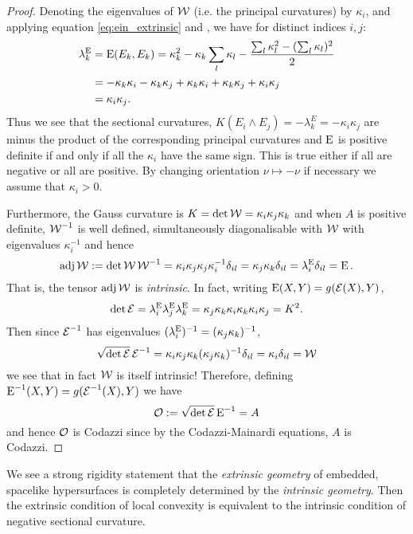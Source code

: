 \documentclass[a4paper, 12pt]{amsart}
\begin{document}
\begin{proof}
Denoting the eigenvalues of \(\operatorname{\mathcal{W}}\) (i.e. the principal curvatures) by \(\kappa_i\), and applying equation \eqref{eq:ein_extrinsic} and , we have for distinct indices \(i,j\):
\[
\begin{split}
\lambda^{\operatorname{E}}_k &= \operatorname{E}(E_k, E_k) = \kappa_k^2 - \kappa_k \sum_l \kappa_l - \frac{\sum_l \kappa_l^2 - (\sum_l \kappa_l)^2}{2} \\
&= - \kappa_k \kappa_i - \kappa_k \kappa_j + \kappa_k \kappa_i + \kappa_k \kappa_j + \kappa_i \kappa_j \\
&= \kappa_i \kappa_j.
\end{split}
\]
Thus we see that the sectional curvatures, \(K(E_i \wedge E_j) = - \lambda^E_k = -\kappa_i\kappa_j\) are minus the product of the corresponding principal curvatures and \(\operatorname{E}\) is positive definite if and only if all the \(\kappa_i\) have the same sign. This is true either if all are negative or all are positive. By changing orientation \(\nu \mapsto -\nu\) if necessary we assume that \(\kappa_i > 0\).

Furthermore, the Gauss curvature is \(K = \det \operatorname{\mathcal{W}} = \kappa_i \kappa_j \kappa_k\) and when \(A\) is positive definite, \(\operatorname{\mathcal{W}}^{-1}\) is well defined, simultaneously diagonalisable with \(\operatorname{\mathcal{W}}\) with eigenvalues \(\kappa_i^{-1}\) and hence
\[
\operatorname{adj} \operatorname{\mathcal{W}} := \det \operatorname{\mathcal{W}} \operatorname{\mathcal{W}}^{-1} = \kappa_i \kappa_j \kappa_j \kappa_i^{-1} \delta_{il} = \kappa_j \kappa_k \delta_{il} = \lambda^{\operatorname{E}}_i \delta_{il} = \operatorname{E}.
\]
That is, the tensor \(\operatorname{adj} \operatorname{\mathcal{W}}\) is \emph{intrinsic}. In fact, writing \(\operatorname{E}(X, Y) = g(\operatorname{\mathcal{E}} (X), Y)\),
\[
\det \operatorname{\mathcal{E}} = \lambda^{\operatorname{E}}_i \lambda^{\operatorname{E}}_j \lambda^{\operatorname{E}}_k = \kappa_j \kappa_k \kappa_i \kappa_k \kappa_i \kappa_j = K^2.
\]
Then since \(\operatorname{\mathcal{E}}^{-1}\) has eigenvalues \((\lambda_i^{\operatorname{E}})^{-1} = (\kappa_j \kappa_k)^{-1}\),
\[
\sqrt{\det \operatorname{\mathcal{E}}} \operatorname{\mathcal{E}}^{-1} = \kappa_i \kappa_j \kappa_k (\kappa_j \kappa_k)^{-1} \delta_{il} = \kappa_i \delta_{il} = \operatorname{\mathcal{W}}
\]
we see that in fact \(\operatorname{\mathcal{W}}\) is itself intrinsic! Therefore, defining \(\operatorname{E}^{-1}(X, Y) = g(\operatorname{\mathcal{E}}^{-1} (X), Y)\) we have
\[
\operatorname{\mathcal{O}} := \sqrt{\det \operatorname{\mathcal{E}}} \operatorname{E}^{-1} = A
\]
and hence \(\operatorname{\mathcal{O}}\) is Codazzi since by the Codazzi-Mainardi equations, \(A\) is Codazzi.
\end{proof}

\begin{rem}
We see a strong rigidity statement that the \emph{extrinsic geometry} of embedded, spacelike hypersurfaces is completely determined by the \emph{intrinsic geometry}. Then the extrinsic condition of local convexity is equivalent to the intrinsic condition of negative sectional curvature.
\end{rem}
\end{document}
